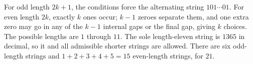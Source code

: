 For odd length $2k+1$, the conditions force the alternating string $101\cdots01$. For even length $2k$, exactly $k$ ones occur; $k-1$ zeroes separate them, and one extra zero may go in any of the $k-1$ internal gaps or the final gap, giving $k$ choices. The possible lengths are $1$ through $11$. The sole length-eleven string is $1365$ in decimal, so it and all admissible shorter strings are allowed. There are six odd-length strings and $1+2+3+4+5=15$ even-length strings, for $\boxed{21}$.

